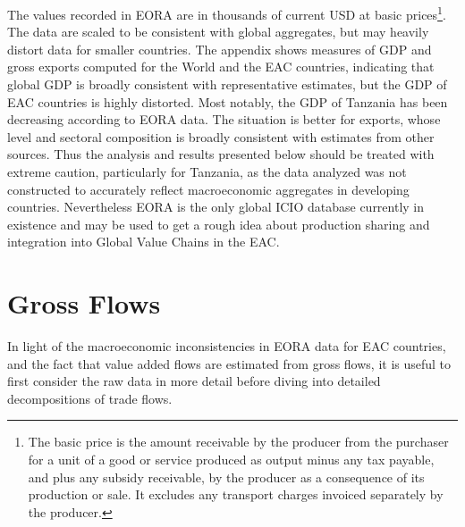 \documentclass[a4paper]{article}
\begin{document}
The values recorded in EORA are in thousands of current USD at basic prices\footnote{The basic price is the amount receivable by the producer from the purchaser for a unit of a good or service produced as output minus any tax payable, and plus any subsidy receivable, by the producer as a consequence of its production or sale. It excludes any transport charges invoiced separately by the producer.}. The data are scaled to be consistent with global aggregates, but may heavily distort data for smaller countries. The appendix shows measures of GDP and gross exports computed for the World and the EAC countries, indicating that global GDP is broadly consistent with representative estimates, but the GDP of EAC countries is highly distorted. Most notably, the GDP of Tanzania has been decreasing according to EORA data. The situation is better for exports, whose level and sectoral composition is broadly consistent with estimates from other sources. Thus the analysis and results presented below should be treated with extreme caution, particularly for Tanzania, as the data analyzed was not constructed to accurately reflect macroeconomic aggregates in developing countries. Nevertheless EORA is the only global ICIO database currently in existence and may be used to get a rough idea about production sharing and integration into Global Value Chains in the EAC. %

\section{Gross Flows}
In light of the macroeconomic inconsistencies in EORA data for EAC countries, and the fact that value added flows are estimated from gross flows, it is useful to first consider the raw data in more detail before diving into detailed decompositions of trade flows. \newline
\end{document}
